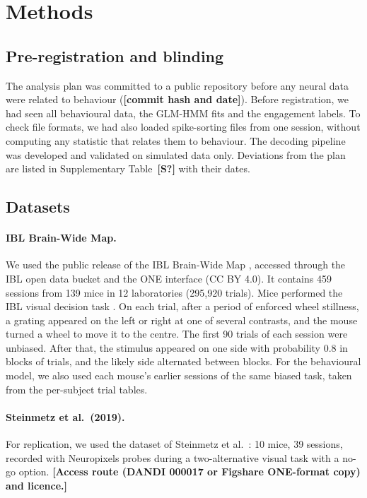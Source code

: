 \documentclass[11pt]{article}
\newcommand{\todo}[1]{\textbf{[#1]}}
\begin{document}
\section{Methods}

\subsection{Pre-registration and blinding}
The analysis plan was committed to a public repository before any neural data were related to behaviour (\todo{commit hash and date}). Before registration, we had seen all behavioural data, the GLM-HMM fits and the engagement labels. To check file formats, we had also loaded spike-sorting files from one session, without computing any statistic that relates them to behaviour. The decoding pipeline was developed and validated on simulated data only. Deviations from the plan are listed in Supplementary Table~\todo{S?} with their dates.

\subsection{Datasets}
\paragraph{IBL Brain-Wide Map.} We used the public release of the IBL Brain-Wide Map \citep{ibl2025bwm}, accessed through the IBL open data bucket and the ONE interface (CC BY 4.0). It contains 459 sessions from 139 mice in 12 laboratories (295,920 trials). Mice performed the IBL visual decision task \citep{ibl2021task}. On each trial, after a period of enforced wheel stillness, a grating appeared on the left or right at one of several contrasts, and the mouse turned a wheel to move it to the centre. The first 90 trials of each session were unbiased. After that, the stimulus appeared on one side with probability 0.8 in blocks of trials, and the likely side alternated between blocks. For the behavioural model, we also used each mouse's earlier sessions of the same biased task, taken from the per-subject trial tables.

\paragraph{Steinmetz et al.\ (2019).} For replication, we used the dataset of Steinmetz et al.\ \citep{steinmetz2019}: 10 mice, 39 sessions, recorded with Neuropixels probes during a two-alternative visual task with a no-go option. \todo{Access route (DANDI 000017 or Figshare ONE-format copy) and licence.}
\end{document}
